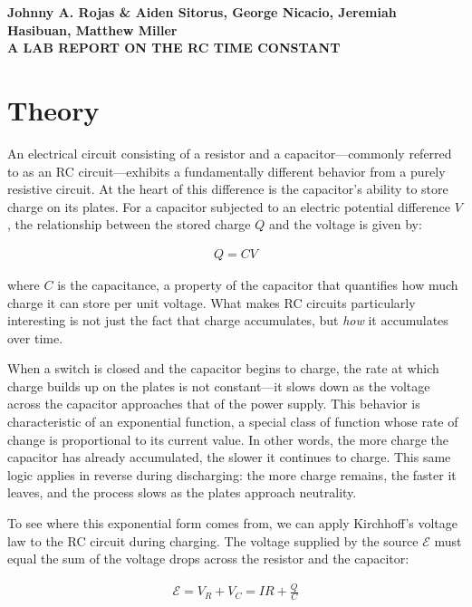 \documentclass[12pt]{article}
\begin{document}
\begin{center}
    {\textbf{Johnny A. Rojas \& Aiden Sitorus, George Nicacio, Jeremiah
        Hasibuan, Matthew Miller}}\\
    {\Large \textbf{A LAB REPORT ON THE RC TIME CONSTANT}}
\end{center}

\section{Theory}

An electrical circuit consisting of a resistor and a capacitor---commonly 
referred to as an RC circuit---exhibits a fundamentally different behavior 
from a purely resistive circuit. At the heart of this difference is the 
capacitor's ability to store charge on its plates. For a capacitor subjected 
to an electric potential difference $V$, the relationship between the stored 
charge $Q$ and the voltage is given by:

\begin{align*}
    Q = CV
\end{align*}

\noindent where $C$ is the capacitance, a property of the capacitor that 
quantifies how much charge it can store per unit voltage. What makes RC 
circuits particularly interesting is not just the fact that charge accumulates, 
but \textit{how} it accumulates over time.

When a switch is closed and the capacitor begins to charge, the rate at which 
charge builds up on the plates is not constant---it slows down as the voltage 
across the capacitor approaches that of the power supply. This behavior is 
characteristic of an exponential function, a special class of function whose 
rate of change is proportional to its current value. In other words, the more 
charge the capacitor has already accumulated, the slower it continues to 
charge. This same logic applies in reverse during discharging: the more charge 
remains, the faster it leaves, and the process slows as the plates approach 
neutrality.

To see where this exponential form comes from, we can apply Kirchhoff's 
voltage law to the RC circuit during charging. The voltage supplied by the 
source $\mathcal{E}$ must equal the sum of the voltage drops across the 
resistor and the capacitor:

\begin{align*}
    \mathcal{E} = V_R + V_C = IR + \frac{Q}{C}
\end{align*}
\end{document}
